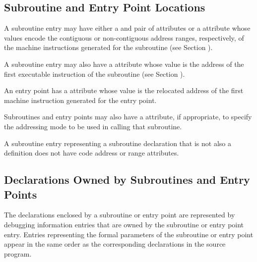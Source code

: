\subsection{Subroutine and Entry Point Locations}
\label{chap:subroutineandentrypointlocations}

A subroutine entry may have either a \DWATlowpc{} and
\DWAThighpc{} pair of attributes or a \DWATranges{} attribute
whose 
values 
encode the contiguous or non-contiguous address
ranges, respectively, of the machine instructions generated
for the subroutine (see 
Section ).

A\hypertarget{chap:DWATentrypcentryaddressofsubprogram}{}
subroutine entry may also have a
\DWATentrypc{} attribute
whose value is the address of the first executable instruction
of the subroutine (see 
Section ).

An entry point has a \DWATlowpc{} attribute whose value is the
relocated address of the first machine instruction generated
for the entry point.


Subroutines and entry points may also have
\bb
a \DWATaddressclassDEFN{}
attribute, if 
\eb
appropriate, to specify
\db
the addressing mode to be used in calling that subroutine.

A subroutine entry representing a subroutine declaration
that is not also a definition does not have code address or
range attributes.


\subsection{Declarations Owned by Subroutines and Entry Points} 
\label{chap:declarationsownedbysubroutinesandentrypoints}
The declarations enclosed by a subroutine or entry point are
represented by debugging information entries that are owned
by the subroutine or entry point entry. Entries representing
the formal parameters of the subroutine or entry point appear
in the same order as the corresponding declarations in the
source program.

